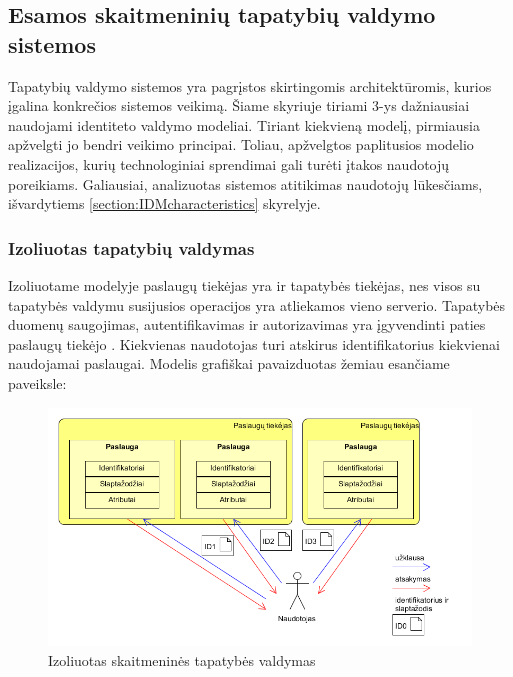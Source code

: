 \subsection{Esamos skaitmeninių tapatybių valdymo sistemos}

Tapatybių valdymo sistemos yra pagrįstos skirtingomis architektūromis, kurios įgalina
konkrečios sistemos veikimą. Šiame skyriuje tiriami 3-ys dažniausiai naudojami identiteto valdymo
modeliai. Tiriant kiekvieną modelį, pirmiausia apžvelgti jo bendri veikimo principai. Toliau, apžvelgtos paplitusios modelio realizacijos, kurių technologiniai
sprendimai gali turėti įtakos naudotojų poreikiams. Galiausiai, analizuotas sistemos atitikimas naudotojų lūkesčiams,
išvardytiems \ref{section:IDMcharacteristics} skyrelyje.

\subsubsection{Izoliuotas tapatybių valdymas}


Izoliuotame modelyje paslaugų tiekėjas yra ir tapatybės tiekėjas, nes visos su tapatybės valdymu
susijusios operacijos yra atliekamos vieno serverio. Tapatybės duomenų saugojimas, autentifikavimas
ir autorizavimas yra įgyvendinti paties paslaugų tiekėjo \cite{Cao2010}. Kiekvienas naudotojas turi atskirus identifikatorius
kiekvienai naudojamai paslaugai. Modelis grafiškai pavaizduotas žemiau esančiame paveiksle:

\begin{figure}[H]
    \centering
    \includegraphics[scale=0.65]{img/IsolatedModel}
    \caption{Izoliuotas skaitmeninės tapatybės valdymas \cite{Cao2010}}
\end{figure}

